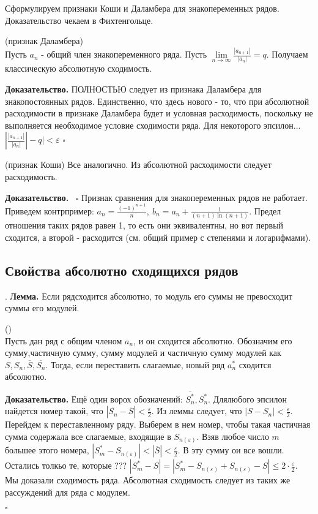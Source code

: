 Сформулируем признаки Коши и Даламбера для знакопеременных рядов.
Доказательство чекаем в Фихтенгольце.
\begin{theor}
    (признак Даламбера)\\
    Пусть $a_n$ - общий член знакопеременного ряда. 
    Пусть  $\lim\limits_{n \to \infty} \frac{|a_{n+1}|}{|a_n|}=q$.
    Получаем классическую абсолютную сходимость. \\

\end{theor}
\textbf{Доказательство.} ПОЛНОСТЬЮ следует из признака Даламбера для 
знакопостоянных рядов. Единственно, что здесь нового - то, что при абсолютной
расходимости в признаке Даламбера будет и условная расходимость, поскольку не 
выполняется необходимое условие сходимости ряда. Для некоторого эпсилон...
$|\frac{|a_{n+1}|}{|a_n|}|-q|<\varepsilon$ 
$\square$ 
\begin{theor}
    (признак Коши) 
    Все аналогично. Из абсолютной расходимости следует расходимость.
\end{theor}
\textbf{Доказательство.}  \
$\square$ 
Признак сравнения для знакопеременных рядов не работает. Приведем 
контрпример: $a_n=\frac{(-1)^{n+1}}{n},~b_n=a_n+\frac{1}{(n+1)\ln(n+1)}$. 
Предел отношения таких рядов равен 1, то есть они эквивалентны, но вот
первый сходится, а второй - расходится (см. общий пример с степенями и 
логарифмами). 
\subsection{Свойства абсолютно сходящихся рядов}.
\textbf{Лемма.} Если рядсходится абсолютно, то модуль его суммы не превосходит
суммы его модулей.
\begin{theor}
    ()\\
    Пусть дан ряд с общим членом $a_n$, и он сходится абсолютно. Обозначим 
    его сумму,частичную сумму, сумму модулей и частичную сумму модулей как
     $S,S_n,\overline{S},\overline{S_n}$. Тогда, если переставить слагаемые, 
     новый ряд $a^*_n$ сходится абсолютно.
\end{theor}
\textbf{Доказательство.} Ещё один ворох обозначений: $\overline{S^*_n},S^*_n$.
Длялюбого эпсилон найдется номер такой, что $|\overline{S_n}-\overline{S}|<
\frac{\varepsilon}{2}$. Из леммы следует, что $|S-S_n|<\frac{\varepsilon}{2}$.
Перейдем к переставленному ряду. Выберем в нем номер, чтобы такая частичная
сумма содержала все слагаемые, входящие в $S_{n(\varepsilon)}$. Взяв 
любое число $m$ большее этого номера,  $|S^*_m-S_{n(\varepsilon)}|<
|\overline{S}|<\frac{\varepsilon}{2}$. В эту сумму ои все вошли. Остались
толкьо те, которые ???
$|S^*_m-S|=|S^*_m-S_{n(\varepsilon)}+S_{n(\varepsilon)}-S|\leqslant 
2\cdot \frac{\varepsilon}{2}$. Мы доказали сходимость ряда.
Абсолютная сходимость следует из таких же рассуждений для ряда с модулем. 


$\square$ 
